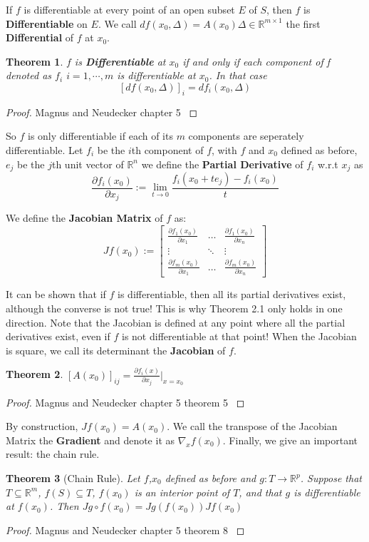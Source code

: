 \documentclass[]{article}
\theoremstyle{mattstyle}
\newtheorem{theorem}{Theorem}[section]
\theoremstyle{definition}
\begin{document}
If $f$ is differentiable at every point of an open subset $E$ of $S$, then $f$ is \textbf{Differentiable} on $E$. We call $df(x_0, \Delta) = A(x_0)\Delta \in \mathbb{R}^{m \times 1}$ the first \textbf{Differential} of $f$ at $x_0$.

\begin{theorem}
	$f$ is \textbf{Differentiable} at $x_0$ if and only if each component of f denoted as $f_i$ $i=1,\cdots, m$ is differentiable at $x_0$. In that case $$[df(x_0, \Delta)]_i = df_i(x_0, \Delta)$$
\end{theorem}
\begin{proof}
	Magnus and Neudecker chapter 5 \cite{magnus1988matrix}
\end{proof}

So $f$ is only differentiable if each of its $m$ components are seperately differentiable. Let $f_i$ be the $i$th component of $f$, with $f$ and $x_0$ defined as before, $e_j$ be the $j$th unit vector of $\mathbb{R}^n$ we define the \textbf{Partial Derivative} of $f_i$ w.r.t $x_j$ as
$$
\frac{\partial f_i(x_0)}{\partial x_j} := \lim\limits_{t \rightarrow 0} \frac{f_i(x_0+te_j) - f_i(x_0)}{t}
$$

We define the \textbf{Jacobian Matrix} of $f$ as:
$$ Jf(x_0) :=  \begin{bmatrix}
\frac{\partial f_1(x_0)}{\partial x_1} & \dots  & \frac{\partial f_1(x_0)}{\partial x_n} \\
\vdots & \ddots & \vdots \\
\frac{\partial f_m(x_0)}{\partial x_1} & \dots  & \frac{\partial f_m(x_0)}{\partial x_n}
\end{bmatrix}$$

It can be shown that if $f$ is differentiable, then all its partial derivatives exist, although the converse is not true! This is why Theorem 2.1 only holds in one direction. Note that the Jacobian is defined at any point where all the partial derivatives exist, even if $f$ is not differentiable at that point! When the Jacobian is square, we call its determinant the \textbf{Jacobian} of $f$.

\begin{theorem}
	$[A(x_0)]_{ij} = \frac{\partial f_i(x)}{\partial x_j}\Bigr\rvert_{x=x_{0}}$
\end{theorem} 
\begin{proof}
	Magnus and Neudecker chapter 5 theorem 5 \cite{magnus1988matrix}
\end{proof}

By construction, $Jf(x_0) = A(x_0)$. We call the transpose of the Jacobian Matrix the \textbf{Gradient} and denote it as $\nabla_x f(x_0)$. Finally, we give an important result: the chain rule.
\begin{theorem}[Chain Rule]
	Let $f$,$x_0$ defined as before and $g: T \rightarrow \mathbb{R}^p$. Suppose that $T \subseteq \mathbb{R}^m$, $f(S) \subseteq T$, $f(x_0)$ is an interior point of $T$, and that $g$ is differentiable at $f(x_0)$. Then $Jg \circ f(x_0) = Jg(f(x_0))Jf(x_0)$
\end{theorem} 
\begin{proof}
	Magnus and Neudecker chapter 5 theorem 8 \cite{magnus1988matrix}
\end{proof}
\end{document}
